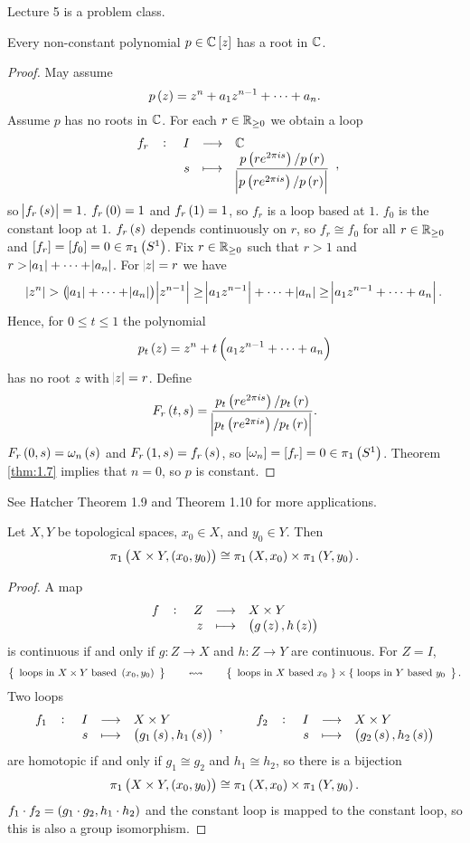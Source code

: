 
Lecture 5 is a problem class.

\pagebreak


\begin{theorem}
Every non-constant polynomial $ p \in \C\sbr{z} $ has a root in $ \mathbb{C} $.
\end{theorem}

\begin{proof}
May assume
$$ p\br{z} = z^n + a_1z^{n - 1} + \dots + a_n. $$
Assume $ p $ has no roots in $ \mathbb{C} $. For each $ r \in \mathbb{R}_{\ge 0} $ we obtain a loop
$$ \function[f_r]{I}{\C}{s}{\dfrac{p\br{re^{2\pi is}} / p\br{r}}{\abs{p\br{re^{2\pi is}} / p\br{r}}}}, $$
so $ \abs{f_r\br{s}} = 1 $. $ f_r\br{0} = 1 $ and $ f_r\br{1} = 1 $, so $ f_r $ is a loop based at $ 1 $. $ f_0 $ is the constant loop at $ 1 $. $ f_r\br{s} $ depends continuously on $ r $, so $ f_r \cong f_0 $ for all $ r \in \mathbb{R}_{\ge 0} $ and $ \sbr{f_r} = \sbr{f_0} = 0 \in \pi_1\br{S^1} $. Fix $ r \in \mathbb{R}_{\ge 0} $ such that $ r > 1 $ and $ r > \abs{a_1} + \dots + \abs{a_n} $. For $ \abs{z} = r $ we have
$$ \abs{z^n} > \br{\abs{a_1} + \dots + \abs{a_n}}\abs{z^{n - 1}} \ge \abs{a_1z^{n - 1}} + \dots + \abs{a_n} \ge \abs{a_1z^{n - 1} + \dots + a_n}. $$
Hence, for $ 0 \le t \le 1 $ the polynomial
$$ p_t\br{z} = z^n + t\br{a_1z^{n - 1} + \dots + a_n} $$
has no root $ z $ with $ \abs{z} = r $. Define
$$ F_r\br{t, s} = \dfrac{p_t\br{re^{2\pi is}} / p_t\br{r}}{\abs{p_t\br{re^{2\pi is}} / p_t\br{r}}}. $$
$ F_r\br{0, s} = \omega_n\br{s} $ and $ F_r\br{1, s} = f_r\br{s} $, so $ \sbr{\omega_n} = \sbr{f_r} = 0 \in \pi_1\br{S^1} $. Theorem \ref{thm:1.7} implies that $ n = 0 $, so $ p $ is constant.
\end{proof}

See Hatcher Theorem 1.9 and Theorem 1.10 for more applications.

\begin{proposition}
Let $ X, Y $ be topological spaces, $ x_0 \in X $, and $ y_0 \in Y $. Then
$$ \pi_1\br{X \times Y, \br{x_0, y_0}} \cong \pi_1\br{X, x_0} \times \pi_1\br{Y, y_0}. $$
\end{proposition}

\begin{proof}
A map
$$ \function[f]{Z}{X \times Y}{z}{\br{g\br{z}, h\br{z}}} $$
is continuous if and only if $ g : Z \to X $ and $ h : Z \to Y $ are continuous. For $ Z = I $,
$$ \correspondence{\text{loops in} \ X \times Y \ \text{based} \ \br{x_0, y_0}}{\text{loops in} \ X \ \text{based} \ x_0 \ \} \times \{ \ \text{loops in} \ Y \ \text{based} \ y_0}. $$
Two loops
$$ \function[f_1]{I}{X \times Y}{s}{\br{g_1\br{s}, h_1\br{s}}}, \qquad \function[f_2]{I}{X \times Y}{s}{\br{g_2\br{s}, h_2\br{s}}} $$
are homotopic if and only if $ g_1 \cong g_2 $ and $ h_1 \cong h_2 $, so there is a bijection
$$ \pi_1\br{X \times Y, \br{x_0, y_0}} \cong \pi_1\br{X, x_0} \times \pi_1\br{Y, y_0}. $$
$ f_1 \cdot f_2 = \br{g_1 \cdot g_2, h_1 \cdot h_2} $ and the constant loop is mapped to the constant loop, so this is also a group isomorphism.
\end{proof}

